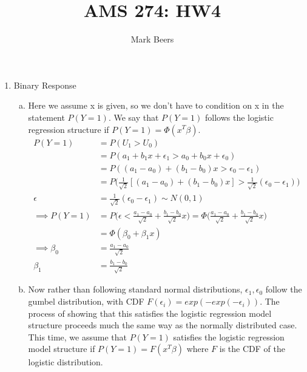 \documentclass[12pt]{article}
\begin{document}
 
 
 
\title{AMS 274: HW4}%
\author{Mark Beers %
} %
 
\maketitle
 
\begin{enumerate}
\item Binary Response
\begin{enumerate}[(a)]
	\item Here we assume x is given, so we don't have to condition on x in the statement $P(Y = 1)$. We say that $P(Y=1)$ follows the logistic regression structure if $P(Y=1) = \Phi(x^T\beta)$.
	\begin{align*}
	P(Y=1) &= P(U_1 > U_0) \\
	&= P(a_1 + b_1 x +\epsilon_1 > a_0 + b_0 x + \epsilon_0) \\
	&= P((a_1 - a_0) + (b_1 - b_0)x > \epsilon_0 - \epsilon_1) \\
	&= P\bigg(\frac{1}{\sqrt{2}}[(a_1 - a_0) + (b_1 - b_0)x] > \frac{1}{\sqrt{2} }(\epsilon_0 - \epsilon_1)\bigg) \\
	\epsilon &= \frac{1}{\sqrt{2}} (\epsilon_0 - \epsilon_1) \sim N(0,1)  \\
	\implies P(Y=1) &=P\bigg(\epsilon < \frac{a_1 - a_0}{\sqrt{2}} + \frac{b_1 - b_0}{\sqrt{2}}x\bigg) = \Phi\bigg(\frac{a_1 - a_0}{\sqrt{2}} + \frac{b_1 - b_0}{\sqrt{2}}x\bigg)\\
	&= \Phi(\beta_0 +\beta_1x) \\
	\implies \beta_0 &= \frac{a_1 - a_0}{\sqrt{2}} \\
	\beta_1 &= \frac{b_1 - b_0}{\sqrt{2}}
	\end{align*}
	\item Now rather than following standard normal distributions, $\epsilon_1, \epsilon_0$ follow the gumbel distribution, with CDF $F(\epsilon_i) = exp(-exp(-\epsilon_i))$. The process of showing that this satisfies the logistic regression model structure proceeds much the same way as the normally distributed case. This time, we assume that $P(Y=1)$ satisfies the logistic regression model structure if $P(Y=1) = F(x^T\beta)$ where $F$ is the CDF of the logistic distribution. 

\end{enumerate}
\end{enumerate}
\end{document}
